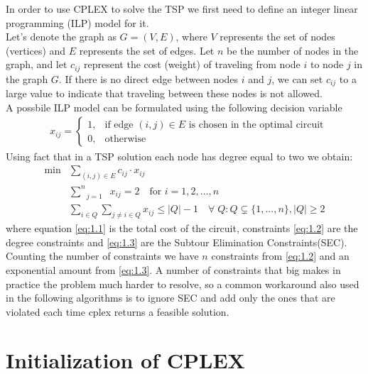 In order to use CPLEX to solve the TSP we first need to define an integer linear programming (ILP) model for it. \\
Let's denote the graph as $G=(V,E)$, where $V$ represents the set of nodes (vertices) and $E$ represents the set of edges.
Let $n$ be the number of nodes in the graph, and let $c_{ij}$ represent the cost (weight) of traveling from node $i$ to node $j$ in the graph $G$. If there is no direct edge between nodes $i$ and $j$, we can set $c_{ij}$ to a large value to indicate that traveling between these nodes is not allowed. \\
A possbile ILP model can be formulated using the following decision variable
\begin{align*}
	& x_{ij} = 
	\begin{cases}
		1, & \text{if edge } (i,j)\in E \text{ is chosen in the optimal circuit}\\
		0, & \text{otherwise}
	\end{cases}
\end{align*}
Using fact that in a TSP solution each node has degree equal to two we obtain:
\begin{align}
	\text{min} &\sum\limits_{(i,j)\in E} c_{ij} \cdot x_{ij} \tag{1.1}\label{eq:1.1} \\
	&\sum\limits_{\:\;\;j=1\:\;\;}^{n} x_{ij} = 2 \quad \text{for } i = 1,2,\ldots,n \tag{1.2}\label{eq:1.2} \\
	& \sum\limits_{i \in Q} \sum\limits_{j\neq i\in Q} x_{ij} \leq |Q| - 1 \quad \forall \; Q: Q \subsetneq \{1,...,n \}, |Q| \geq 2 \tag{1.3}\label{eq:1.3}
\end{align}
where equation \eqref{eq:1.1} is the total cost of the circuit, constraints \eqref{eq:1.2} are the degree constraints and \eqref{eq:1.3} are the Subtour Elimination Constraints(SEC). Counting the number of constraints we have $n$ constraints from \eqref{eq:1.2} and an exponential amount from \eqref{eq:1.3}. A number of constraints that big makes in practice the problem much harder to resolve, so a common workaround also used in the following algorithms is to ignore SEC and add only the ones that are violated each time cplex returns a feasible solution.

\section{Initialization of CPLEX}

